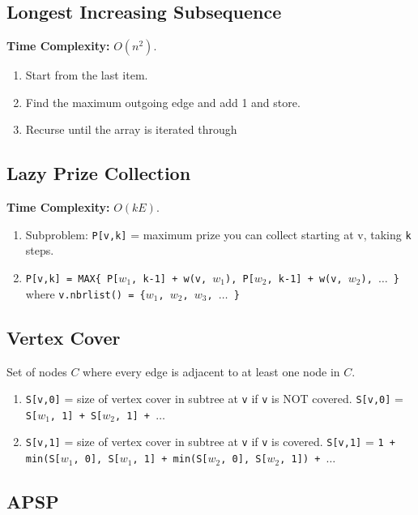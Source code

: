 \documentclass[10pt,landscape,a4paper]{article}
\begin{document}
\begin{multicols*}{4}
\subsection{Longest Increasing Subsequence}
\textbf{Time Complexity:} $O(n^2)$.
\begin{enumerate}
    \item Start from the last item.
    \item Find the maximum outgoing edge and add 1 and store.
    \item Recurse until the array is iterated through
\end{enumerate}

\subsection{Lazy Prize Collection}
\textbf{Time Complexity:} $O(kE)$.
\begin{enumerate}
    \item Subproblem: \texttt{P[v,k]} = maximum prize you can collect starting at v, taking \texttt{k} steps. 
    \item \texttt{P[v,k] = MAX\{ P[$w_1$, k-1] + w(v, $w_1$), P[$w_2$, k-1] + w(v, $w_2$), $\dots$ \}} where \texttt{v.nbrlist() = \{$w_1$, $w_2$, $w_3$, $\dots$ \}}
\end{enumerate}

\subsection{Vertex Cover}
Set of nodes $C$ where every edge is adjacent to at least one node in $C$.
\begin{enumerate}
    \item \texttt{S[v,0]} = size of vertex cover in subtree at \texttt{v} if \texttt{v} is NOT covered.
    \subitem \texttt{S[v,0]} = \texttt{S[$w_1$, 1] + S[$w_2$, 1] + $\dots$}
    \item \texttt{S[v,1]} = size of vertex cover in subtree at \texttt{v} if \texttt{v} is covered.
    \subitem \texttt{S[v,1]} = \texttt{1 + min(S[$w_1$, 0], S[$w_1$, 1] + min(S[$w_2$, 0], S[$w_2$, 1]) + $\dots$}
\end{enumerate}

\subsection{APSP}


\end{multicols*}
\end{document}
